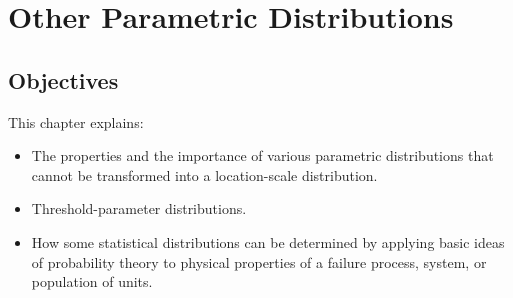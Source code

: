 \setcounter{chapter}{4}

\chapter{Other Parametric Distributions}
\label{chapter:other.parametric.models}



\section*{Objectives}
This chapter explains:
\begin{itemize}
\item 
The properties and the importance
of various parametric distributions 
that cannot be transformed into a location-scale distribution.
\item 
Threshold-parameter distributions.
\item
How some statistical distributions can be determined 
by applying basic ideas of probability theory to
physical properties of a failure process, system, or population
of units.
\end{itemize}


